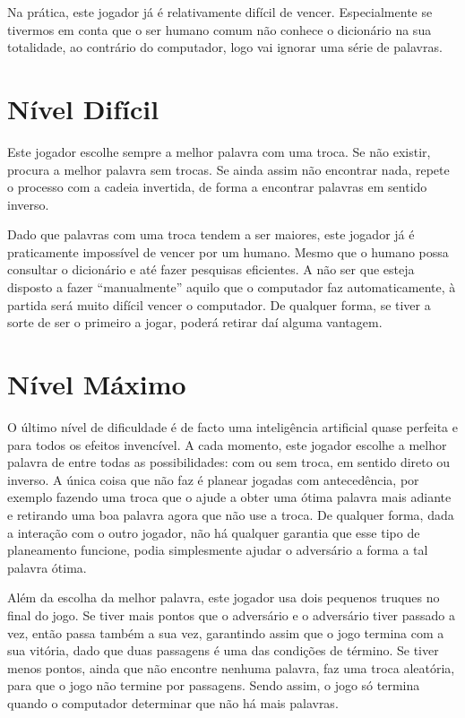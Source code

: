 \documentclass[12pt,a4paper,reqno]{report}
\numberwithin{equation}{section}
\begin{document}
Na prática, este jogador já é relativamente difícil de vencer. Especialmente se tivermos em conta que o ser humano comum não conhece o dicionário na sua totalidade, ao contrário do computador, logo vai ignorar uma série de palavras.

\section {Nível Difícil}

Este jogador escolhe sempre a melhor palavra com uma troca. Se não existir, procura a melhor palavra sem trocas. Se ainda assim não encontrar nada, repete o processo com a cadeia invertida, de forma a encontrar palavras em sentido inverso.

Dado que palavras com uma troca tendem a ser maiores, este jogador já é praticamente impossível de vencer por um humano. Mesmo que o humano possa consultar o dicionário e até fazer pesquisas eficientes. A não ser que esteja disposto a fazer ``manualmente'' aquilo que o computador faz automaticamente, à partida será muito difícil vencer o computador. De qualquer forma, se tiver a sorte de ser o primeiro a jogar, poderá retirar daí alguma vantagem.

\section {Nível Máximo}

O último nível de dificuldade é de facto uma inteligência artificial quase perfeita e para todos os efeitos invencível. A cada momento, este jogador escolhe a melhor palavra de entre todas as possibilidades: com ou sem troca, em sentido direto ou inverso. A única coisa que não faz é planear jogadas com antecedência, por exemplo fazendo uma troca que o ajude a obter uma ótima palavra mais adiante e retirando uma boa palavra agora que não use a troca. De qualquer forma, dada a interação com o outro jogador, não há qualquer garantia que esse tipo de planeamento funcione, podia simplesmente ajudar o adversário a forma a tal palavra ótima.

Além da escolha da melhor palavra, este jogador usa dois pequenos truques no final do jogo. Se tiver mais pontos que o adversário e o adversário tiver passado a vez, então passa também a sua vez, garantindo assim que o jogo termina com a sua vitória, dado que duas passagens é uma das condições de término. Se tiver menos pontos, ainda que não encontre nenhuma palavra, faz uma troca aleatória, para que o jogo não termine por passagens. Sendo assim, o jogo só termina quando o computador determinar que não há mais palavras.
\end{document}
